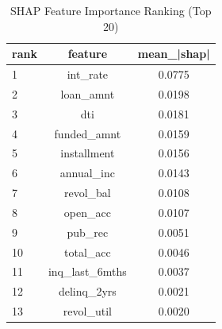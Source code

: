 \begin{table}
\centering
\caption{SHAP Feature Importance Ranking (Top 20)}
\label{tab:shap_ranking}
\begin{tabular}{lcc}
\toprule
rank & feature & mean_|shap| \\
\midrule
1 & int_rate & 0.0775 \\
2 & loan_amnt & 0.0198 \\
3 & dti & 0.0181 \\
4 & funded_amnt & 0.0159 \\
5 & installment & 0.0156 \\
6 & annual_inc & 0.0143 \\
7 & revol_bal & 0.0108 \\
8 & open_acc & 0.0107 \\
9 & pub_rec & 0.0051 \\
10 & total_acc & 0.0046 \\
11 & inq_last_6mths & 0.0037 \\
12 & delinq_2yrs & 0.0021 \\
13 & revol_util & 0.0020 \\
\bottomrule
\end{tabular}
\end{table}
